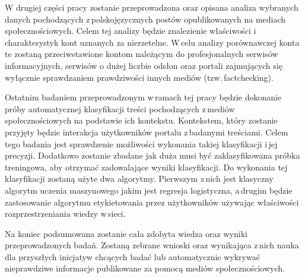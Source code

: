 \par
W drugiej części pracy zostanie przeprowadzona oraz opisana analiza wybranych danych pochodzących z\,polskojęzycznych postów opublikowanych na mediach społecznościowych. Celem tej analizy będzie znalezienie właściwości i\,charakterystyk kont uznanych za nierzetelne. W\,celu analizy porównawczej konta te zostaną przeciwstawione kontom należącym do profesjonalnych serwisów informacyjnych, serwisów o dużej liczbie odsłon oraz portali zajmujących się wyłącznie sprawdzaniem prawdziwości innych mediów (tzw.\,factchecking).
\par
Ostatnim badaniem przeprowadzonym w\,ramach tej pracy będzie dokonanie próby automatycznej klasyfikacji treści pochodzących z\,mediów społecznościowych na podstawie ich kontekstu. Kontekstem, który zostanie przyjęty będzie interakcja użytkowników portalu z\,badanymi treściami. Celem tego badania jest sprawdzenie możliwości wykonania takiej klasyfikacji i\,jej precyzji. Dodatkowo zostanie zbadane jak duża musi być zaklasyfikowana próbka treningowa, aby otrzymać zadowalające wyniki klasyfikacji. Do wykonania tej klasyfikacji zostaną użyte dwa algorytmy. Pierwszym z\,nich jest klasyczny algorytm uczenia maszynowego jakim jest regresja logistyczna, a\,drugim będzie zastosowanie algorytmu etykietowania przez użytkowników używając właściwości rozprzestrzeniania wiedzy w\,sieci. 
\par
Na koniec podsumowana zostanie cała zdobyta wiedza oraz wyniki przeprowadzonych badań. Zostaną zebrane wnioski oraz wynikająca z\,nich nauka dla przyszłych inicjatyw chcących badać lub automatycznie wykrywać nieprawdziwe informacje publikowane za pomocą mediów społecznościowych. 

